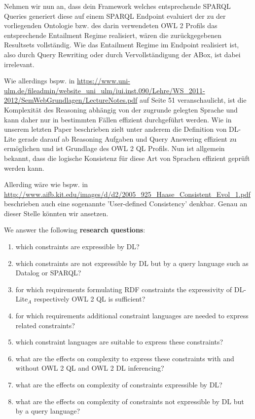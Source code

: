 \documentclass{llncs}
\begin{document}
Nehmen wir nun an, dass dein Framework welches entsprechende SPARQL Queries generiert diese auf einem SPARQL Endpoint evaluiert der zu der vorliegenden Ontologie bzw. des darin verwendeten OWL 2 Profils das entsprechende Entailment Regime realisiert, wären die zurückgegebenen Resultsets vollständig. Wie das Entailment Regime im Endpoint realisiert ist, also durch Query Rewriting oder durch Vervollständigung der ABox, ist dabei irrelevant.

Wie allerdings bspw. in 
\url{https://www.uni-ulm.de/fileadmin/website_uni_ulm/iui.inst.090/Lehre/WS_2011-2012/SemWebGrundlagen/LectureNotes.pdf}
auf Seite 51 veranschaulicht, ist die Komplexität des Reasoning abhängig von der zugrunde gelegten Sprache und kann daher nur in bestimmten Fällen effizient durchgeführt werden. Wie in unserem letzten Paper beschrieben zielt unter anderem die Definition von DL-Lite gerade darauf ab Reasoning Aufgaben und Query Answering effizient zu ermöglichen und ist Grundlage des OWL 2 QL Profils. Nun ist allgemein bekannt, dass die logische Konsistenz für diese Art von Sprachen effizient geprüft werden kann. 

Allerding wäre wie bspw. in 
\url{http://www.aifb.kit.edu/images/d/d2/2005_925_Haase_Consistent_Evol_1.pdf} beschrieben auch eine sogenannte 'User-defined Consistency' denkbar. Genau an dieser Stelle könnten wir ansetzen.

We answer the following \textbf{research questions}:
\begin{enumerate}
	\item which constraints are expressible by DL?
	\item which constraints are not expressible by DL but by a query language such as Datalog or SPARQL?
	\item for which requirements formulating RDF constraints the expressivity of DL-Lite$_A$ respectively OWL 2 QL is sufficient?
	\item for which requirements additional constraint languages are needed to express related constraints?
	\item which constraint languages are suitable to express these constraints?
	\item what are the effects on complexity to express these constraints with and without OWL 2 QL and OWL 2 DL inferencing?
	\item what are the effects on complexity of constraints expressible by DL?
	\item what are the effects on complexity of constraints not expressible by DL but by a query language?
\end{enumerate}
\end{document}

